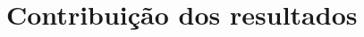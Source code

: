 \begin{comment}
\section{Rotinas de programação em economia}

Em economia, é comum o uso de \textit{softwares} dedicados à determinadas tarefas acadêmicas. No entanto, cada vez mais são utilizadas linguagens de programação nas mais diferentes áreas de conhecimento. O desenvolvimento de rotinas de programação possibilita uma maior autonomia do pesquisador para resolver problemas específicos e assim avançar na linha de pesquisa. Além disso, a distribuição dos programas criados pode contribuir para o avanço de outras fronteiras de pesquisa de forma mais difusa.

\end{comment}


\begin{comment}
\end{comment}



{\let\clearpage\relax \chapter{Contribuição dos resultados}\label{relev}}

